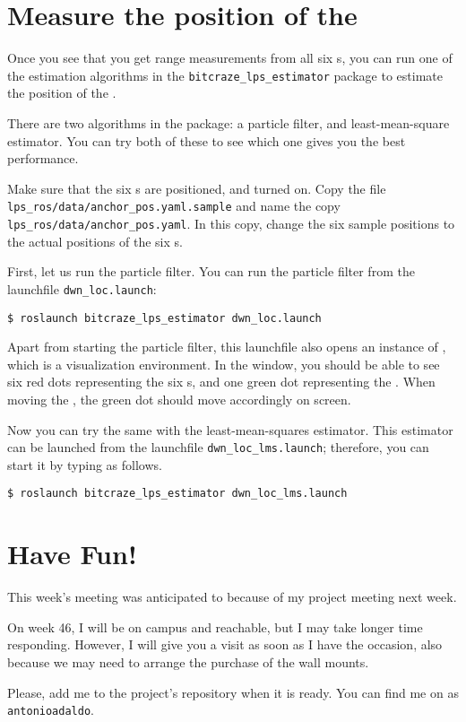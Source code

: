 \section*{Measure the position of the \CF}

Once you see that you get range measurements from all six \LPN{}s, you can run one of the estimation algorithms in the \verb|bitcraze_lps_estimator| package to estimate the position of the \CF{}.

There are two algorithms in the package: a particle filter, and least-mean-square estimator.
You can try both of these to see which one gives you the best performance.

Make sure that the six \LPN{}s are positioned, and turned on.
Copy the file \verb|lps_ros/data/anchor_pos.yaml.sample| and name the copy \verb|lps_ros/data/anchor_pos.yaml|.
In this copy, change the six sample positions to the actual positions of the six \LPN{}s.

First, let us run the particle filter. You can run the particle filter from the launchfile \verb|dwn_loc.launch|:

\begin{Verbatim}[fontsize=\small]
  $ roslaunch bitcraze_lps_estimator dwn_loc.launch
\end{Verbatim}

Apart from starting the particle filter, this launchfile also opens an instance of \RViz{}, which is a visualization environment.
In the \RViz{} window, you should be able to see six red dots representing the six \LPN{}s, and one green dot representing the \CF{}.
When moving the \CF{}, the green dot should move accordingly on screen.

Now you can try the same with the least-mean-squares estimator.
This estimator can be launched from the launchfile \verb|dwn_loc_lms.launch|; therefore, you can start it by typing as follows.

\begin{Verbatim}[fontsize=\small]
  $ roslaunch bitcraze_lps_estimator dwn_loc_lms.launch
\end{Verbatim}






\section*{Have Fun!}

This week's meeting was anticipated to  because of my project meeting next week.

On week 46, I will be on campus and reachable, but I may take longer time responding.
However, I will give you a visit as soon as I have the occasion, also because we may need to arrange the purchase of the wall mounts.

Please, add me to the project's \Github{} repository when it is ready.
You can find me on \Github{} as \verb|antonioadaldo|.

